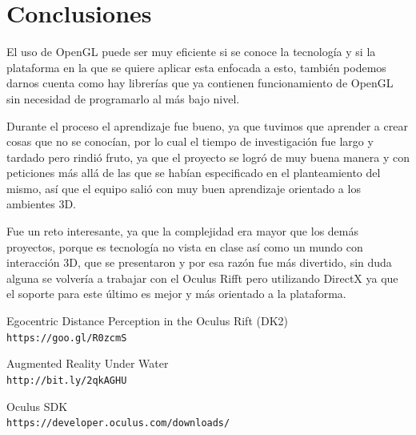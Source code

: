 \documentclass[10pt, a4paper, twocolumn]{article}
\begin{document}
\section{Conclusiones}
El uso de OpenGL puede ser muy eficiente si se conoce la tecnología y si la plataforma en la que se quiere aplicar esta enfocada a esto, también podemos darnos cuenta como hay librerías que ya contienen funcionamiento de OpenGL sin necesidad de programarlo al más bajo nivel.

Durante el proceso el aprendizaje fue bueno, ya que tuvimos que aprender a crear cosas que no se conocían, por lo cual el tiempo de investigación fue largo y tardado pero rindió fruto, ya que el proyecto se logró de muy buena manera y con peticiones más allá de las que se habían especificado en el planteamiento del mismo, así que el equipo salió con muy buen aprendizaje orientado a los ambientes 3D.

Fue un reto interesante, ya que la complejidad era mayor que los demás proyectos, porque es tecnología no vista en clase así como un mundo con interacción 3D, que se presentaron y por esa razón fue más divertido, sin duda alguna se volvería a trabajar con el Oculus Rifft pero utilizando DirectX ya que el soporte para este último es mejor y más orientado a la plataforma.


\begin{thebibliography}{9}
Egocentric Distance Perception in the Oculus Rift (DK2)
\\\texttt{https://goo.gl/R0zcmS}

Augmented Reality Under Water
\\\texttt{http://bit.ly/2qkAGHU}

Oculus SDK
\\\texttt{https://developer.oculus.com/downloads/}
\end{thebibliography}

\end{document}
